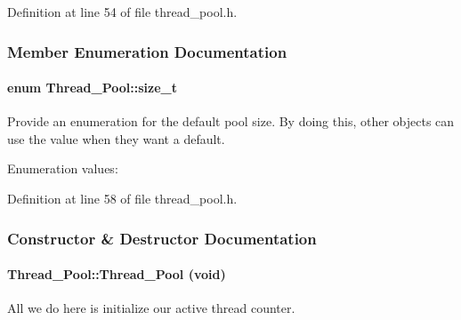 Definition at line 54 of file thread\_\-pool.h.

\subsubsection{Member Enumeration Documentation}
\hypertarget{classThread__Pool_Thread__Pools3}{
\paragraph[size\_\-t]{\setlength{\rightskip}{0pt plus 5cm}enum Thread\_\-Pool::size\_\-t}\hfill}
\label{classThread__Pool_Thread__Pools3}


Provide an enumeration for the default pool size. By doing this, other objects can use the value when they want a default. \begin{Desc}
\item[Enumeration values: ]\par
\begin{description}
\item[{\em 
\hypertarget{classThread__Pool_Thread__Pools3Thread__Pools2}{
{\em default\_\-pool\_\-size\_\-}}
\label{classThread__Pool_Thread__Pools3Thread__Pools2}
}]\end{description}
\end{Desc}



Definition at line 58 of file thread\_\-pool.h.

\subsubsection{Constructor \& Destructor Documentation}
\hypertarget{classThread__Pool_Thread__Poola0}{
\paragraph[Thread\_\-Pool]{\setlength{\rightskip}{0pt plus 5cm}Thread\_\-Pool::Thread\_\-Pool (void)}\hfill}
\label{classThread__Pool_Thread__Poola0}


All we do here is initialize our active thread counter. 

